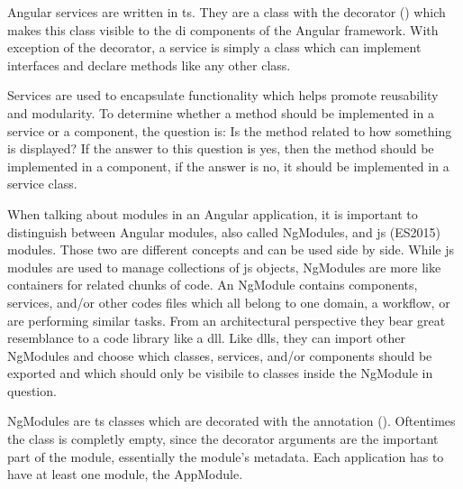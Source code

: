 
Angular services are written in \gls{ts}. They are a class with the  decorator () which makes this class visible to the \gls{di} components of the Angular framework. With exception of the decorator, a service is simply a class which can implement interfaces and declare methods like any other class.

Services are used to encapsulate functionality which helps promote reusability and modularity. To determine whether a method should be implemented in a service or a component, the question is: Is the method related to how something is displayed? If the answer to this question is yes, then the method should be implemented in a component, if the answer is no, it should be implemented in a service class.



When talking about modules in an Angular application, it is important to distinguish between Angular modules, also called NgModules, and \gls{js} (ES2015) modules. Those two are different concepts and can be used side by side. While \gls{js} modules are used to manage collections of \gls{js} objects, NgModules are more like containers for related chunks of code. An NgModule contains components, services, and/or other codes files which all belong to one domain, a workflow, or are performing similar tasks. From an architectural perspective they bear great resemblance to a code library like a \gls{dll}. Like \gls{dll}s, they can import other NgModules and choose which classes, services, and/or components should be exported and which should only be visibile to classes inside the NgModule in question.


NgModules are \gls{ts} classes which are decorated with the  annotation (). Oftentimes the class is completly empty, since the decorator arguments are the important part of the module, essentially the module's metadata. Each application has to have at least one module, the AppModule.

